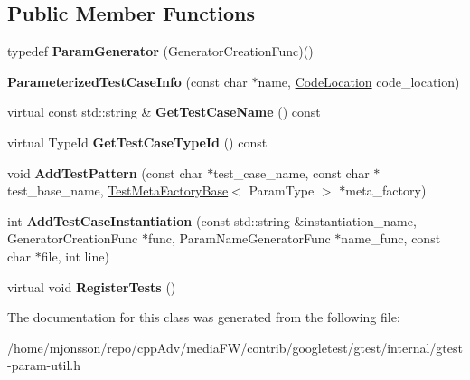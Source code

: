 \subsection*{Public Member Functions}
\begin{DoxyCompactItemize}
\item 
\mbox{\label{classtesting_1_1internal_1_1ParameterizedTestCaseInfo_a2f6a423f7ae8c7ac24b468538693aa26}} 
typedef {\bfseries Param\+Generator} (Generator\+Creation\+Func)()
\item 
\mbox{\label{classtesting_1_1internal_1_1ParameterizedTestCaseInfo_a6d19f368428260bd5c6e608b4d3fc6af}} 
{\bfseries Parameterized\+Test\+Case\+Info} (const char $\ast$name, \hyperlink{structtesting_1_1internal_1_1CodeLocation}{Code\+Location} code\+\_\+location)
\item 
\mbox{\label{classtesting_1_1internal_1_1ParameterizedTestCaseInfo_a8a9eafc7654b154165f131974397e200}} 
virtual const std\+::string \& {\bfseries Get\+Test\+Case\+Name} () const
\item 
\mbox{\label{classtesting_1_1internal_1_1ParameterizedTestCaseInfo_a16ed77e95a6042c722d0029744acfc33}} 
virtual Type\+Id {\bfseries Get\+Test\+Case\+Type\+Id} () const
\item 
\mbox{\label{classtesting_1_1internal_1_1ParameterizedTestCaseInfo_a3e557c888ec5e23b138c2ff254db15e5}} 
void {\bfseries Add\+Test\+Pattern} (const char $\ast$test\+\_\+case\+\_\+name, const char $\ast$test\+\_\+base\+\_\+name, \hyperlink{classtesting_1_1internal_1_1TestMetaFactoryBase}{Test\+Meta\+Factory\+Base}$<$ Param\+Type $>$ $\ast$meta\+\_\+factory)
\item 
\mbox{\label{classtesting_1_1internal_1_1ParameterizedTestCaseInfo_adefded091e3f20ac3a758029caea3eab}} 
int {\bfseries Add\+Test\+Case\+Instantiation} (const std\+::string \&instantiation\+\_\+name, Generator\+Creation\+Func $\ast$func, Param\+Name\+Generator\+Func $\ast$name\+\_\+func, const char $\ast$file, int line)
\item 
\mbox{\label{classtesting_1_1internal_1_1ParameterizedTestCaseInfo_a7e118820b3074ce70c0440e2e49a50a1}} 
virtual void {\bfseries Register\+Tests} ()
\end{DoxyCompactItemize}


The documentation for this class was generated from the following file\+:\begin{DoxyCompactItemize}
\item 
/home/mjonsson/repo/cpp\+Adv/media\+F\+W/contrib/googletest/gtest/internal/gtest-\/param-\/util.\+h\end{DoxyCompactItemize}
